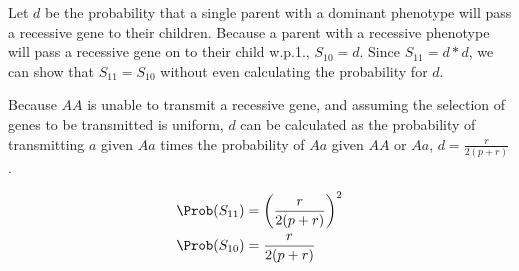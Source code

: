 \begin{solution}

    Let $d$ be the probability that a single parent with a dominant
    phenotype will pass a recessive gene to their children. Because a
    parent with a recessive phenotype will pass a recessive gene on to
    their child w.p.1., $S_{10} = d$. Since $S_{11} = d * d$, we can
    show that $S_{11} = S_{10}$ without even calculating the probability
    for $d$.

    Because $AA$ is unable to transmit a recessive gene, and assuming
    the selection of genes to be transmitted is uniform, $d$ can be
    calculated as the probability of transmitting $a$ given $Aa$ times
    the probability of $Aa$ given $AA$ or $Aa$,
    $d = \frac{r}{2(p + r)}$.

    \begin{align*}
        \Prob(S_{11}) &= \left(\frac{r}{2(p+r)}\right)^2 \\
        \Prob(S_{10}) &= \frac{r}{2(p+r)}
    \end{align*}

\end{solution}

